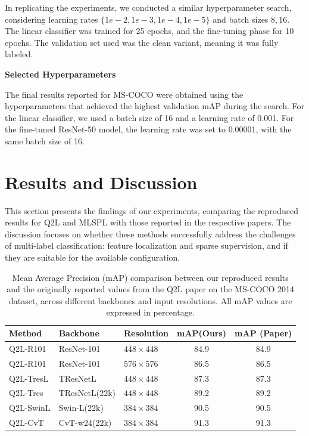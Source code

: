 \documentclass[lettersize,journal]{IEEEtran}
\renewcommand{\paragraph}[1]{%
  \vspace{1.5ex}\textbf{#1}\quad
}
\begin{document}
In replicating the experiments, we conducted a similar hyperparameter search, considering learning rates  $\{1e-2, 1e-3, 1e-4, 1e-5\}$ and batch sizes ${8, 16}$. The linear classifier was trained for 25 epochs, and the fine-tuning phase for 10 epochs. The validation set used was the clean variant, meaning it was fully labeled.

\paragraph{Selected Hyperparameters}
The final results reported for MS-COCO were obtained using the hyperparameters that achieved the highest validation mAP during the search. For the linear classifier, we used a batch size of 16 and a learning rate of 0.001. For the fine-tuned ResNet-50 model, the learning rate was set to 0.00001, with the same batch size of 16.


\section{Results and Discussion}
\label{sec:results}
This section presents the findings of our experiments, comparing the reproduced results for Q2L and MLSPL with those reported in the respective papers. The discussion focuses on whether these methods successfully address the challenges of multi-label classification: feature localization and sparse supervision, and if they are suitable for the available configuration.

\begin{table}[t]
    \small
    \caption{Mean Average Precision (mAP) comparison between our reproduced results and the originally reported values from the Q2L paper on the MS-COCO 2014 dataset, across different backbones and input resolutions. All mAP values are expressed in percentage.}
    \label{tab:q2l_map_comparison}
    \centering
    \begin{tabular}{l l l c c}
    \toprule
    \textbf{Method} & \textbf{Backbone} & \textbf{Resolution} & \textbf{mAP(Ours)} & \textbf{mAP (Paper)} \\
    \midrule
    Q2L-R101     & ResNet-101     & $448\times448$ & 84.9 & 84.9 \\
    Q2L-R101     & ResNet-101     & $576\times576$ & 86.5 & 86.5 \\
    Q2L-TresL    & TResNetL       & $448\times448$ & 87.3 & 87.3 \\
    Q2L-Tres     & TResNetL(22k)  & $448\times448$ & 89.2 & 89.2 \\
    Q2L-SwinL    & Swin-L(22k)    & $384\times384$ & 90.5 & 90.5 \\
    Q2L-CvT      & CvT-w24(22k)   & $384\times384$ & 91.3 & 91.3 \\
    \bottomrule
    \end{tabular}
\end{table}
\end{document}
